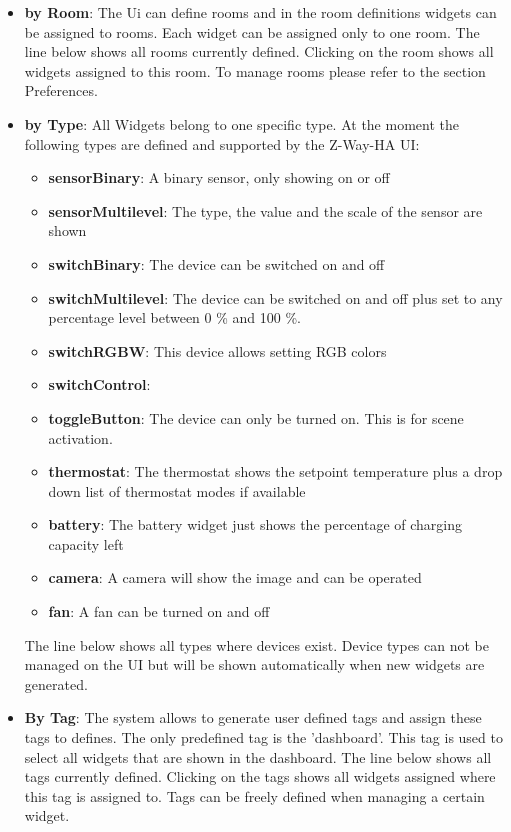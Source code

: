 \begin{itemize}
\item \textbf{by Room}:  The Ui can define rooms and in the room definitions widgets
can be assigned to rooms. Each widget can be assigned only to one room. The line below shows
all rooms currently defined. Clicking on the room shows all widgets assigned to this room. 
To manage rooms please refer to the section Preferences.
\item \textbf{by Type}:  All Widgets belong to one specific type. At the moment the following
types are defined and supported by the Z-Way-HA UI:
\begin{itemize}
\item \textbf{sensorBinary}: A binary sensor, only showing on or off
\item \textbf{sensorMultilevel}: The type, the value and the scale of the sensor are shown
\item \textbf{switchBinary}: The device can be switched on and off
\item \textbf{switchMultilevel}: The device can be switched on and off plus set to any
percentage level between 0 \% and 100 \%.
\item \textbf{switchRGBW}: This device allows setting RGB colors
\item \textbf{switchControl}:
\item \textbf{toggleButton}: The device can only be turned on. This is for scene activation.
\item \textbf{thermostat}: The thermostat shows the setpoint temperature plus a drop 
down list of thermostat modes if available
\item \textbf{battery}: The battery widget just shows the percentage of charging capacity left
\item \textbf{camera}: A camera will show the image and can be operated
\item \textbf{fan}: A fan can be turned on and off
\end{itemize}
The line below shows
all types where devices exist. Device types can not be managed on the UI but will be shown
automatically when new widgets are generated.
\item \textbf{By Tag}:  The system allows to generate user defined tags and assign 
these tags to defines. The only predefined tag is the 'dashboard'. This tag is used to 
select all widgets that are shown in the dashboard.
The line below shows all tags currently defined. Clicking on the tags shows all 
widgets assigned where this tag is assigned to. Tags can be freely defined when managing
a certain widget.
\end{itemize}

